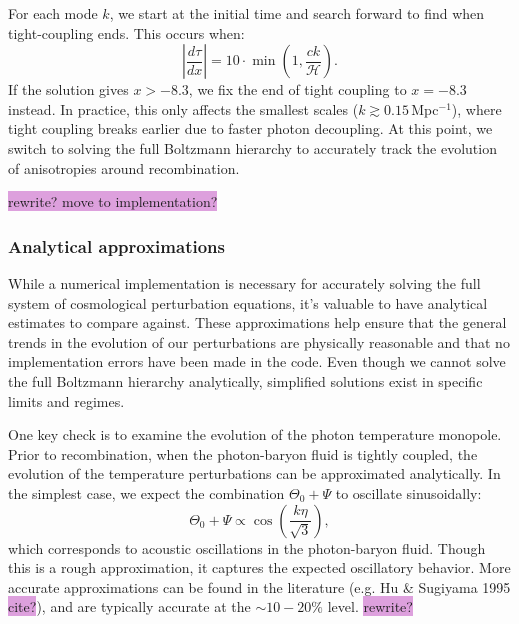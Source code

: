 \documentclass{aa}
\numberwithin{equation}{section}
\numberwithin{table}{section}
\numberwithin{figure}{section}
\begin{document}
For each mode $k$, we start at the initial time and search forward to find when tight-coupling ends. This occurs when:
\begin{equation}
\left| \frac{d\tau}{dx} \right| = 10 \cdot \min\left(1, \frac{ck}{\mathcal{H}} \right).
\end{equation}
If the solution gives $x > -8.3$, we fix the end of tight coupling to $x = -8.3$ instead. In practice, this only affects the smallest scales ($k \gtrsim 0.15\,$Mpc$^{-1}$), where tight coupling breaks earlier due to faster photon decoupling. At this point, we switch to solving the full Boltzmann hierarchy to accurately track the evolution of anisotropies around recombination. 

\colorbox{Plum}{rewrite? move to implementation?}



\subsubsection{Analytical approximations}
While a numerical implementation is necessary for accurately solving the full system of cosmological perturbation equations, it's valuable to have analytical estimates to compare against. These approximations help ensure that the general trends in the evolution of our perturbations are physically reasonable and that no implementation errors have been made in the code. Even though we cannot solve the full Boltzmann hierarchy analytically, simplified solutions exist in specific limits and regimes.

One key check is to examine the evolution of the photon temperature monopole. Prior to recombination, when the photon-baryon fluid is tightly coupled, the evolution of the temperature perturbations can be approximated analytically. In the simplest case, we expect the combination $\Theta_0 + \Psi$ to oscillate sinusoidally:
\begin{equation}
\Theta_0 + \Psi \propto \cos\left(\frac{k\eta}{\sqrt{3}}\right),
\end{equation}
which corresponds to acoustic oscillations in the photon-baryon fluid. Though this is a rough approximation, it captures the expected oscillatory behavior. More accurate approximations can be found in the literature (e.g. Hu \& Sugiyama 1995 \colorbox{Plum}{cite?}), and are typically accurate at the $\sim 10 - 20\%$ level. \colorbox{Plum}{rewrite?}
\end{document}
